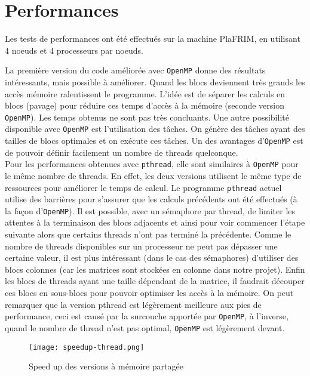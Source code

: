 \section{Performances} %
\label{sec:perf}

Les tests de performances ont été effectués sur la machine PlaFRIM, en utilisant 4 noeuds et 4 processeurs par noeuds.

La première version du code améliorée avec \texttt{OpenMP} donne des résultats intéressants, mais possible à améliorer. Quand les blocs deviennent très grands les accès mémoire ralentissent le programme. L'idée est de séparer les calculs en blocs (pavage) pour réduire ces temps d'accès à la mémoire (seconde version \texttt{OpenMP}). Les temps obtenus ne sont pas très concluants. Une autre possibilité disponible avec \texttt{OpenMP} est l'utilisation des tâches. On génère des tâches ayant des tailles de blocs optimales et on exécute ces tâches. Un des avantages d'\texttt{OpenMP} est de pouvoir définir facilement un nombre de threads quelconque.\\

Pour les performances obtenues avec \texttt{pthread}, elle sont similaires à \texttt{OpenMP} pour le même nombre de threads. En effet, les deux versions utilisent le même type de ressources pour améliorer le temps de calcul. Le programme \texttt{pthread} actuel utilise des barrières pour s'assurer que les calculs précédents ont été effectués (à la façon d'\texttt{OpenMP}). Il est possible, avec un sémaphore par thread, de limiter les attentes à la terminaison des blocs adjacents et ainsi pour voir commencer l'étape suivante alors que certains threads n'ont pas terminé la précédente. Comme le nombre de threads disponibles sur un processeur ne peut pas dépasser une certaine valeur, il est plus intéressant (dans le cas des sémaphores) d'utiliser des blocs colonnes (car les matrices sont stockées en colonne dans notre projet). Enfin les blocs de threads ayant une taille dépendant de la matrice, il faudrait découper ces blocs en sous-blocs pour pouvoir optimiser les accès à la mémoire. On peut remarquer que la version pthread est légèrement meilleure aux pics de performance, ceci est causé par la surcouche apportée par \texttt{OpenMP}, à l'inverse, quand le nombre de thread n'est pas optimal, \texttt{OpenMP} est légèrement devant.

\begin{figure}[h!]
\centering
\texttt{[image: speedup-thread.png]}
\caption{Speed up des versions à mémoire partagée}
\label{fig:sp-thread}
\end{figure}

